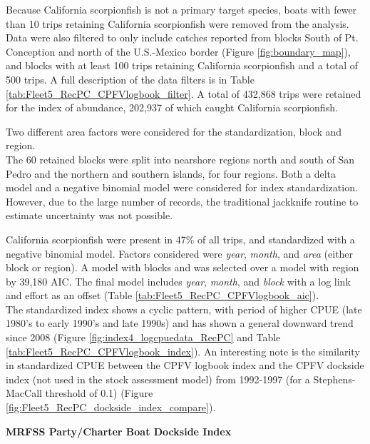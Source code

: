 \documentclass[12pt,]{article}
\begin{document}
Because California scorpionfish is not a primary target species, boats
with fewer than 10 trips retaining California scorpionfish were removed
from the analysis. Data were also filtered to only include catches
reported from blocks South of Pt. Conception and north of the
U.S.-Mexico border (Figure \ref{fig:boundary_map}), and blocks with at
least 100 trips retaining California scorpionfish and a total of 500
trips. A full description of the data filters is in Table
\ref{tab:Fleet5_RecPC_CPFVlogbook_filter}. A total of 432,868 trips were
retained for the index of abundance, 202,937 of which caught California
scorpionfish.

Two different area factors were considered for the standardization,
block and region.\\
The 60 retained blocks were split into nearshore regions north and south
of San Pedro and the northern and southern islands, for four regions.
Both a delta model and a negative binomial model were considered for
index standardization. However, due to the large number of records, the
traditional jackknife routine to estimate uncertainty was not possible.

California scorpionfish were present in 47\% of all trips, and
standardized with a negative binomial model. Factors considered were
\emph{year}, \emph{month}, and \emph{area} (either block or region). A
model with blocks and was selected over a model with region by 39,180
AIC. The final model includes \emph{year}, \emph{month}, and
\emph{block} with a log link and effort as an offset (Table
\ref{tab:Fleet5_RecPC_CPFVlogbook_aic}).\\
The standardized index shows a cyclic pattern, with period of higher
CPUE (late 1980's to early 1990's and late 1990s) and has shown a
general downward trend since 2008 (Figure
\ref{fig:index4_logcpuedata_RecPC} and Table
\ref{tab:Fleet5_RecPC_CPFVlogbook_index}). An interesting note is the
similarity in standardized CPUE between the CPFV logbook index and the
CPFV dockside index (not used in the stock assessment model) from
1992-1997 (for a Stephens-MacCall threshold of 0.1) (Figure
\ref{fig:Fleet5_RecPC_dockside_index_compare}).

\textbf{MRFSS Party/Charter Boat Dockside Index}
\end{document}
